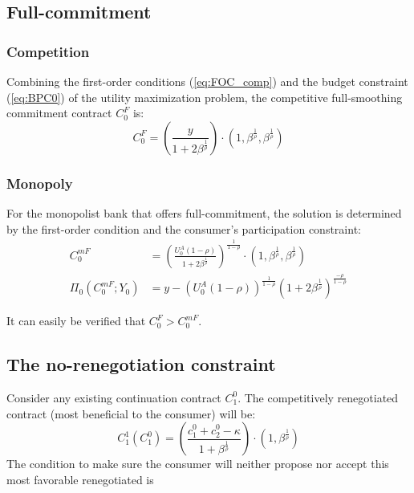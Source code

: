 \documentclass[11pt,english]{article}
\theoremstyle{plain}
\theoremstyle{definition}
\begin{document}
\subsection{Full-commitment}

\subsubsection{Competition}

Combining the first-order conditions (\ref{eq:FOC_comp}) and the
budget constraint (\ref{eq:BPC0}) of the utility maximization problem,
the competitive full-smoothing commitment contract $C_{0}^{F}$ is:
\begin{equation}
C_{0}^{F}=\left(\frac{y}{1+2\beta^{\frac{1}{\rho}}}\right)\cdot\left(1,\beta^{\frac{1}{\rho}},\beta^{\frac{1}{\rho}}\right)\label{eq:c-f}
\end{equation}


\subsubsection{Monopoly}

For the monopolist bank that offers full-commitment, the solution
is determined by the first-order condition and the consumer's participation
constraint: 
\begin{align}
C_{0}^{mF} & =\left(\frac{U_{0}^{A}\left(1-\rho\right)}{1+2\beta^{\frac{1}{\rho}}}\right)^{\frac{1}{1-\rho}}\cdot\left(1,\beta^{\frac{1}{\rho}},\beta^{\frac{1}{\rho}}\right)\label{eq:c-mf}\\
\Pi_{0}\left(C_{0}^{mF};Y_{0}\right) & =y-\left(U_{0}^{A}\left(1-\rho\right)\right)^{\frac{1}{1-\rho}}\left(1+2\beta^{\frac{1}{\rho}}\right)^{\frac{-\rho}{1-\rho}}\label{eq:pi-mf}
\end{align}

It can easily be verified that $C_{0}^{F}>C_{0}^{mF}$.

\subsection{The no-renegotiation constraint }

Consider any existing continuation contract $C_{1}^{0}$. The competitively
renegotiated contract (most beneficial to the consumer) will be: 
\begin{equation}
C_{1}^{1}\left(C_{1}^{0}\right)=\left(\frac{c_{1}^{0}+c_{2}^{0}-\kappa}{1+\beta^{\frac{1}{\rho}}}\right)\cdot\left(1,\beta^{\frac{1}{\rho}}\right)\label{eq:c-r}
\end{equation}
The condition to make sure the consumer will neither propose nor accept
this most favorable renegotiated is
\end{document}
